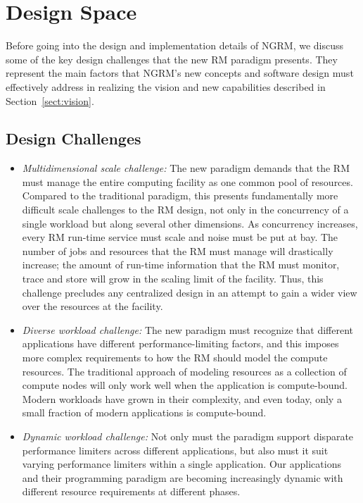\documentclass{article}
\newcommand{\ngrm}{NGRM}
\begin{document}
\section{Design Space}
\label{sect:designspace}

Before going into the design and implementation details of \ngrm, we discuss 
some of the key design challenges that the new RM paradigm presents. 
They represent the main factors that \ngrm's new concepts and software design
must effectively address in realizing the vision and new capabilities described in 
Section~\ref{sect:vision}. 

\subsection{Design Challenges}

\begin{itemize}
\item{\sl Multidimensional scale challenge:} The new paradigm demands that 
      the RM must manage the entire computing facility as one common pool of 
      resources. Compared to the traditional paradigm, this presents 
      fundamentally more difficult scale challenges to the RM design,
      not only in the concurrency of a single workload but along
      several other dimensions. As concurrency increases, every RM run-time
      service must scale and noise must be put at bay.  
      The number of jobs and resources 
      that the RM must manage will drastically increase; the amount 
      of run-time information that the RM must monitor, trace and store 
      will grow in the scaling limit of the facility.
      Thus, this challenge precludes any centralized design in an attempt to 
      gain a wider view over the resources at the facility. 

\item{\sl Diverse workload challenge:} The new paradigm must recognize that
      different applications have different performance-limiting factors,
      and this imposes more complex requirements to how the RM should
      model the compute resources. The traditional approach of modeling 
      resources as a collection of compute nodes will only work well when the
      application is compute-bound. Modern workloads have grown in their
      complexity, and even today, only a small fraction of modern applications
      is compute-bound.
       
\item{\sl Dynamic workload challenge:} Not only must the paradigm support 
      disparate performance limiters across different applications, but
      also must it suit varying performance limiters within 
      a single application. Our applications and their programming paradigm
      are becoming increasingly dynamic with different resource requirements
      at different phases.


\end{itemize}
\end{document}
